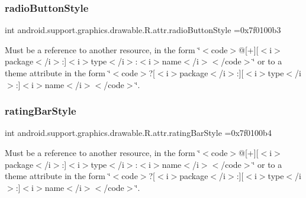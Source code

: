 \subsubsection{\texorpdfstring{radio\+Button\+Style}{radioButtonStyle}}
{\footnotesize\ttfamily int android.\+support.\+graphics.\+drawable.\+R.\+attr.\+radio\+Button\+Style =0x7f0100b3\hspace{0.3cm}{\ttfamily [static]}}

Must be a reference to another resource, in the form \char`\"{}$<$code$>$@\mbox{[}+\mbox{]}\mbox{[}$<$i$>$package$<$/i$>$\+:\mbox{]}$<$i$>$type$<$/i$>$\+:$<$i$>$name$<$/i$>$$<$/code$>$\char`\"{} or to a theme attribute in the form \char`\"{}$<$code$>$?\mbox{[}$<$i$>$package$<$/i$>$\+:\mbox{]}\mbox{[}$<$i$>$type$<$/i$>$\+:\mbox{]}$<$i$>$name$<$/i$>$$<$/code$>$\char`\"{}. \mbox{\label{classandroid_1_1support_1_1graphics_1_1drawable_1_1R_1_1attr_ac462ba2799f135334e61fe837147e40e}} 
\subsubsection{\texorpdfstring{rating\+Bar\+Style}{ratingBarStyle}}
{\footnotesize\ttfamily int android.\+support.\+graphics.\+drawable.\+R.\+attr.\+rating\+Bar\+Style =0x7f0100b4\hspace{0.3cm}{\ttfamily [static]}}

Must be a reference to another resource, in the form \char`\"{}$<$code$>$@\mbox{[}+\mbox{]}\mbox{[}$<$i$>$package$<$/i$>$\+:\mbox{]}$<$i$>$type$<$/i$>$\+:$<$i$>$name$<$/i$>$$<$/code$>$\char`\"{} or to a theme attribute in the form \char`\"{}$<$code$>$?\mbox{[}$<$i$>$package$<$/i$>$\+:\mbox{]}\mbox{[}$<$i$>$type$<$/i$>$\+:\mbox{]}$<$i$>$name$<$/i$>$$<$/code$>$\char`\"{}. \mbox{\label{classandroid_1_1support_1_1graphics_1_1drawable_1_1R_1_1attr_aa40ae836c1f8275dfe413649c38627c1}} 
